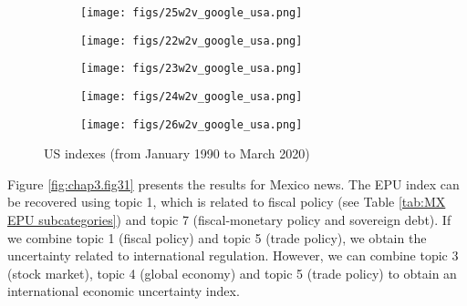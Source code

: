 \documentclass{article}
\begin{document}
\begin{figure}[ht] 
  \begin{subfigure}[b]{0.5\linewidth}
    \centering
    \texttt{[image: figs/25w2v\_google\_usa.png]}
    \caption{}
    \vspace{4ex}
  \end{subfigure}%
  \begin{subfigure}[b]{0.5\linewidth}
    \centering
    \texttt{[image: figs/22w2v\_google\_usa.png]} 
    \caption{} 
    \vspace{4ex}
  \end{subfigure} 
  \begin{subfigure}[b]{0.5\linewidth}
    \centering
    \texttt{[image: figs/23w2v\_google\_usa.png]} 
    \caption{} 
  \end{subfigure}%
  \begin{subfigure}[b]{0.5\linewidth}
    \centering
    \texttt{[image: figs/24w2v\_google\_usa.png]} 
    \caption{} 
  \end{subfigure} 
  \begin{subfigure}[b]{0.5\linewidth}
    \centering
    \texttt{[image: figs/26w2v\_google\_usa.png]} 
    \caption{} 
  \end{subfigure}%
  
  \caption{US indexes (from January 1990 to March 2020)}
    \label{fig:chap3.fig30}
\end{figure}


Figure \ref{fig:chap3.fig31} presents the results for Mexico news. The EPU index can be recovered using topic 1, which is related to fiscal policy (see Table \ref{tab:MX EPU subcategories}) and topic 7 (fiscal-monetary policy and sovereign debt). If we combine topic 1 (fiscal policy) and topic 5 (trade policy), we obtain the uncertainty related to international regulation. However, we can combine topic 3 (stock market), topic 4 (global economy) and topic 5 (trade policy) to obtain an international economic uncertainty index.
\end{document}
